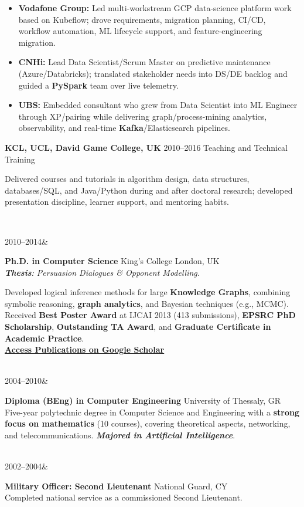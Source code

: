 \documentclass[]{friggeri-cv}
\renewcommand{\entry}[4]{%
  \parbox[t]{\dimexpr\textwidth-\entryleftinset\relax}{%
    \textbf{#2}%
    {\footnotesize\addfontfeature{Color=lightgray}\hspace{0.6em}#1}%
    \hfill%
    {\small\color{textcolor} #3}\\%
    #4\vspace{\parsep}%
  }\\}
\renewcommand{\entrytwo}[4]{%
  #1&\parbox[t]{14cm}{%
    \textbf{#2}%
    \hfill%
    {\small\color{textcolor} #3}\\%
    #4\vspace{\parsep}%
  }\\}
\begin{document}
\begin{entrylist}
{{        }
        \begin{itemize}[leftmargin=1.1em]
            \item \footnotesize\textbf{Vodafone Group:} Led multi-workstream GCP data-science platform work based on Kubeflow; drove requirements, migration planning, CI/CD, workflow automation, ML lifecycle support, and feature-engineering migration.
            \item \footnotesize\textbf{CNHi:} Lead Data Scientist/Scrum Master on predictive maintenance (Azure/Databricks); translated stakeholder needs into DS/DE backlog and guided a \textbf{PySpark} team over live telemetry.
            \item \footnotesize\textbf{UBS:} Embedded consultant who grew from Data Scientist into ML Engineer through XP/pairing while delivering graph/process-mining analytics, observability, and real-time \textbf{Kafka}/Elasticsearch pipelines.
        \end{itemize}
    }
    \entry
    {2010--2016}
    {KCL, UCL, David Game College, UK}
    {Teaching and Technical Training}
    {
        {\small
        \setlength{\parindent}{0pt}
        \setlength{\leftskip}{0pt}
        Delivered courses and tutorials in algorithm design, data structures, databases/SQL, and Java/Python during and after doctoral research; developed presentation discipline, learner support, and mentoring habits.

        }
    }
\end{entrylist}
\newpage
\setlength{\parskip}{2pt}
\setlength{\parsep}{0pt}
\begin{entrylist2}
    \entrytwo
        {\small 2010--2014}
        {\small Ph.D. in Computer Science}
        {\small King's College London, UK}
        {\small \emph{\textbf{Thesis}: Persuasion Dialogues \& Opponent Modelling.}

        {\footnotesize Developed logical inference methods for large \textbf{Knowledge Graphs}, combining symbolic reasoning, \textbf{graph analytics}, and Bayesian techniques (e.g., MCMC). Received \textbf{Best Poster Award} at IJCAI 2013 (413 submissions), \textbf{EPSRC PhD Scholarship}, \textbf{Outstanding TA Award}, and \textbf{Graduate Certificate in Academic Practice}.
        \\ \textbf{\textcolor{blue}{\href{https://scholar.google.com/citations?hl=en&user=Rr3KTx8AAAAJ}{\underline{Access Publications on Google Scholar}}}}}
        }
    \entrytwo
        {\small  2004--2010}
        {\small Diploma (BEng) in Computer Engineering}
        {\small University of Thessaly, GR}
        {\footnotesize Five-year polytechnic degree in Computer Science and Engineering with a \textbf{strong focus on mathematics} (10 courses), covering theoretical aspects, networking, and telecommunications. \emph{\textbf{Majored in Artificial Intelligence}}.}
    \entrytwo
        {\small  2002--2004}
        {\small Military Officer: Second Lieutenant}
        {\small National Guard, CY}
        {\small Completed national service as a commissioned Second Lieutenant.}
\end{entrylist2}
\end{document}
